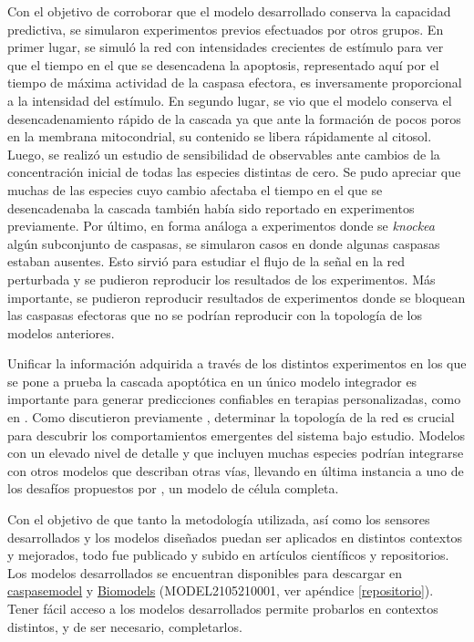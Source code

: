 Con el objetivo de corroborar que el modelo desarrollado conserva la capacidad predictiva, se simularon experimentos previos efectuados por otros grupos. En primer lugar, se simuló la red con intensidades crecientes de estímulo para ver que el tiempo en el que se desencadena la apoptosis, representado aquí por el tiempo de máxima actividad de la caspasa efectora, es inversamente proporcional a la intensidad del estímulo. En segundo lugar, se vio que el modelo conserva el desencadenamiento rápido de la cascada ya que ante la formación de pocos poros en la membrana mitocondrial, su contenido se libera rápidamente al citosol. Luego, se realizó un estudio de sensibilidad de observables ante cambios de la concentración inicial de todas las especies distintas de cero. Se pudo apreciar que muchas de las especies cuyo cambio afectaba el tiempo en el que se desencadenaba la cascada también había sido reportado en experimentos previamente. Por último, en forma análoga a experimentos donde se \textit{knockea} algún subconjunto de caspasas, se simularon casos en donde algunas caspasas estaban ausentes. Esto sirvió para estudiar el flujo de la señal en la red perturbada y se pudieron reproducir los resultados de los experimentos. Más importante, se pudieron reproducir resultados de experimentos donde se bloquean las caspasas efectoras que no se podrían reproducir con la topología de los modelos anteriores.

Unificar la información adquirida a través de los distintos experimentos en los que se pone a prueba la cascada apoptótica en un único modelo integrador es importante para generar predicciones confiables en terapias personalizadas, como en \cite{Eduati2020}. Como discutieron previamente \cite{Santolini2018}, determinar la topología de la red es crucial para descubrir los comportamientos emergentes del sistema bajo estudio. Modelos con un elevado nivel de detalle y que incluyen muchas especies podrían integrarse con otros modelos que describan otras vías, llevando en última instancia a uno de los desafíos propuestos por \cite{Karr2015}, un modelo de célula completa.

Con el objetivo de que tanto la metodología utilizada, así como los sensores desarrollados y los modelos diseñados puedan ser aplicados en distintos contextos y mejorados, todo fue publicado y subido en artículos científicos y repositorios. Los modelos desarrollados se encuentran disponibles para descargar en \href{https://github.com/acorbat/caspase_model/tree/master}{caspase\textunderscore model} y \href{https://www.ebi.ac.uk/biomodels/MODEL2105210001}{Biomodels} (MODEL2105210001, ver apéndice \ref{repositorio}). Tener fácil acceso a los modelos desarrollados permite probarlos en contextos distintos, y de ser necesario, completarlos. 

